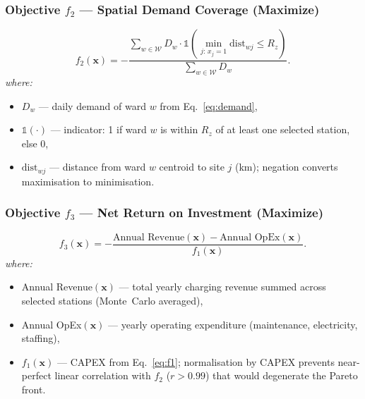 \subsubsection*{Objective $f_2$ — Spatial Demand Coverage (Maximize)}
\begin{equation}
f_2(\mathbf{x})
= -\frac{\displaystyle\sum_{w \in \mathcal{W}}
    D_w \cdot \mathbb{1}\!\left(
    \min_{j:\,x_j=1}\mathrm{dist}_{wj} \leq R_z\right)}
  {\displaystyle\sum_{w \in \mathcal{W}} D_w}.
\label{eq:f2}
\end{equation}
\textit{where:}
\begin{itemize}
  \item $D_w$ — daily demand of ward $w$ from Eq.~\eqref{eq:demand},
  \item $\mathbb{1}(\cdot)$ — indicator: 1 if ward $w$ is within $R_z$
        of at least one selected station, else 0,
  \item $\mathrm{dist}_{wj}$ — distance from ward $w$ centroid to site
        $j$ (km); negation converts maximisation to minimisation.
\end{itemize}

\subsubsection*{Objective $f_3$ — Net Return on Investment (Maximize)}
\begin{equation}
f_3(\mathbf{x})
= -\frac{\text{Annual Revenue}(\mathbf{x})
         - \text{Annual OpEx}(\mathbf{x})}
        {f_1(\mathbf{x})}.
\label{eq:f3}
\end{equation}
\textit{where:}
\begin{itemize}
  \item Annual Revenue$(\mathbf{x})$ — total yearly charging revenue
        summed across selected stations (Monte~Carlo averaged),
  \item Annual OpEx$(\mathbf{x})$ — yearly operating expenditure
        (maintenance, electricity, staffing),
  \item $f_1(\mathbf{x})$ — CAPEX from Eq.~\eqref{eq:f1}; normalisation
        by CAPEX prevents near-perfect linear correlation with $f_2$
        ($r > 0.99$) that would degenerate the Pareto front.
\end{itemize}

